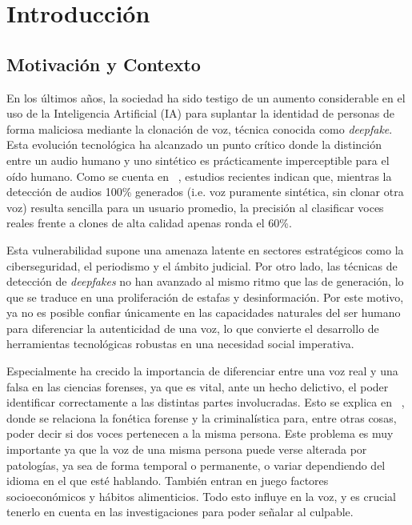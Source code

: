 \chapter{Introducción}

\section{Motivación y Contexto}
En los últimos años, la sociedad ha sido testigo de un aumento considerable en el uso de la Inteligencia Artificial (IA) para suplantar la identidad de personas de forma maliciosa mediante la clonación de voz, técnica conocida como \textit{deepfake}. Esta evolución tecnológica ha alcanzado un punto crítico donde la distinción entre un audio humano y uno sintético es prácticamente imperceptible para el oído humano. Como se cuenta en ~\parencite{Barrington2025, Nadine2025}, estudios recientes indican que, mientras la detección de audios 100\% generados (i.e. voz puramente sintética, sin clonar otra voz) resulta sencilla para un usuario promedio, la precisión al clasificar voces reales frente a clones de alta calidad apenas ronda el 60\%.

Esta vulnerabilidad supone una amenaza latente en sectores estratégicos como la ciberseguridad, el periodismo y el ámbito judicial. Por otro lado, las técnicas de detección de \textit{deepfakes} no han avanzado al mismo ritmo que las de generación, lo que se traduce en una proliferación de estafas y desinformación. Por este motivo, ya no es posible confiar únicamente en las capacidades naturales del ser humano para diferenciar la autenticidad de una voz, lo que convierte el desarrollo de herramientas tecnológicas robustas en una necesidad social imperativa.

Especialmente ha crecido la importancia de diferenciar entre una voz real y una falsa en las ciencias forenses, ya que es vital, ante un hecho delictivo, el poder identificar correctamente a las distintas partes involucradas. Esto se explica en ~\parencite{Peña2024}, donde se relaciona la fonética forense y la criminalística para, entre otras cosas, poder decir si dos voces pertenecen a la misma persona. Este problema es muy importante ya que la voz de una misma persona puede verse alterada por patologías, ya sea de forma temporal o permanente, o variar dependiendo del idioma en el que esté hablando. También entran en juego factores socioeconómicos y hábitos alimenticios. Todo esto influye en la voz, y es crucial tenerlo en cuenta en las investigaciones para poder señalar al culpable.

